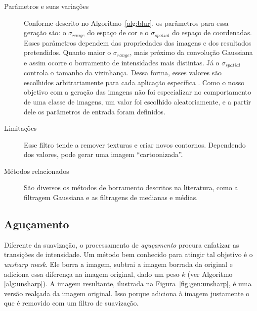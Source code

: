 \begin{description}
  \item[Parâmetros e suas variações] Conforme descrito no Algoritmo~\ref{alg:blur}, os parâmetros para essa geração são: o $\sigma_{range}$ do espaço de cor e o $\sigma_{spatial}$ do espaço de coordenadas. Esses parâmetros dependem das propriedades das imagens e dos resultados pretendidos. Quanto maior o $\sigma_{range}$, mais próximo da convolução Gaussiana e assim ocorre o borramento de intensidades mais distintas. Já o $\sigma_{spatial}$ controla o tamanho da vizinhança. Dessa forma, esses valores são escolhidos arbitrariamente para cada aplicação específica \cite{Tomasi1998}. Como o nosso objetivo com a geração das imagens não foi especializar no comportamento de uma classe de imagens, um valor foi escolhido aleatoriamente, e a partir dele os parâmetros de entrada foram definidos.

  \item[Limitações] Esse filtro tende a remover texturas e criar novos contornos. Dependendo dos valores, pode gerar uma imagem ``cartoonizada''.

  \item[Métodos relacionados] São diversos os métodos de borramento descritos na literatura, como a filtragem Gaussiana e as filtragens de medianas e médias.
\end{description}
\FloatBarrier
\subsection{Aguçamento}

Diferente da suavização, o processamento de \emph{aguçamento} procura enfatizar as transições de intensidade. Um método bem conhecido para atingir tal objetivo é o \textit{unsharp mask}. Ele borra a imagem, subtrai a imagem borrada da original e adiciona essa diferença na imagem original, dado um peso $k$ (ver Algoritmo \ref{alg:unsharp}). A imagem resultante, ilustrada na Figura~\ref{fig:gen:unsharp}, é uma versão realçada da imagem original. Isso porque adiciona à imagem justamente o que é removido com um filtro de suavização.


